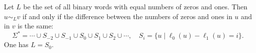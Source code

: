 \begin{exl}
Let $L$ be the set of all binary words with equal numbers of zeros and ones.
Then $u \sim_L v$ if and only if the difference between the numbers of zeros and ones in $u$ and in $v$ is the same:
\[
\Sigma^* = \cdots \cup S_{-2} \cup S_{-1} \cup S_0 \cup S_1 \cup S_2 \cup \cdots, \quad S_i = \{u \mid \ell_0(u) - \ell_1(u) = i\}.
\]
One has $L = S_0$.
\end{exl}